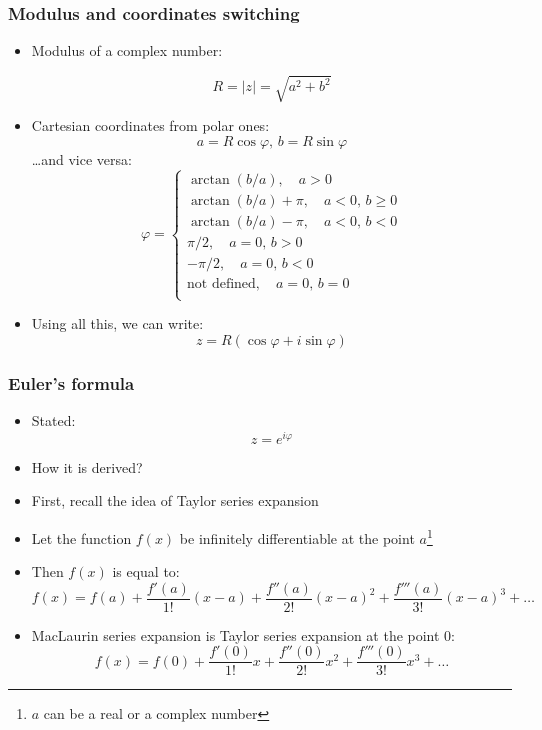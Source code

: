 \documentclass[10pt]{beamer}
\theoremstyle{definition}
\begin{document}
\begin{frame}[fragile]
	\frametitle{Modulus and coordinates switching}
	\begin{itemize}
		\item Modulus of a complex number: 
		
		\[
		R = |z| = \sqrt{a^{2} + b^{2}}
		\]
		
		\item Cartesian coordinates from polar ones:
		\[
		a = R\cos\varphi,\, b = R\sin\varphi
		\]
		\noindent \ldots and vice versa:
		\[
		\varphi = 
		\left\{
		\begin{array}{l}
			\arctan(b/a),\quad a > 0\\
			\arctan(b/a) + \pi,\quad a < 0,\, b \geq 0\\
			\arctan(b/a) - \pi,\quad a < 0,\, b < 0\\
			\pi/2, \quad a = 0,\, b > 0\\
			-\pi/2, \quad a = 0,\, b < 0\\
			\textrm{not defined}, \quad a = 0,\, b = 0\\
		\end{array}
		\right.
		\]
		
		\item Using all this, we can write:
		\[
		z = R(\cos \varphi + i \sin\varphi)
		\]
	\end{itemize}
\end{frame}

\begin{frame}[fragile]
	\frametitle{Euler's formula}
	\begin{itemize}
		\item Stated:
		\[
		z = e^{i\varphi}
		\]
		\item How it is derived?
		\item First, recall the idea of Taylor series expansion
		\item Let the function $f(x)$ be infinitely differentiable at the point $a$\footnote{$a$ can be a real or a complex number}
		\item Then $f(x)$ is equal to:
		\[
		f(x) = f(a) + \frac{f'(a)}{1!}(x-a) + \frac{f''(a)}{2!}(x-a)^{2} + \frac{f'''(a)}{3!}(x-a)^{3} + \ldots
		\]
		\item MacLaurin series expansion is Taylor series expansion at the point 0:
		\[
		f(x) = f(0) + \frac{f'(0)}{1!}x + \frac{f''(0)}{2!}x^{2} + \frac{f'''(0)}{3!}x^{3} + \ldots
		\]
	\end{itemize}
\end{frame}
\end{document}
